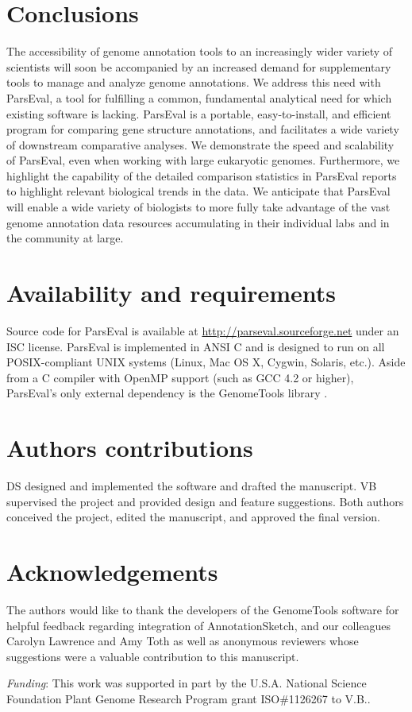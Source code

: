 \section{Conclusions}
The accessibility of genome annotation tools to an increasingly wider variety of scientists will soon be accompanied by an increased demand for supplementary tools to manage and analyze genome annotations.
We address this need with ParsEval, a tool for fulfilling a common, fundamental analytical need for which existing software is lacking.
ParsEval is a portable, easy-to-install, and efficient program for comparing gene structure annotations, and facilitates a wide variety of downstream comparative analyses.
We demonstrate the speed and scalability of ParsEval, even when working with large eukaryotic genomes.
Furthermore, we highlight the capability of the detailed comparison statistics in ParsEval reports to highlight relevant biological trends in the data.
We anticipate that ParsEval will enable a wide variety of biologists to more fully take advantage of the vast genome annotation data resources accumulating in their individual labs and in the community at large.


\section{Availability and requirements}
Source code for ParsEval is available at \url{http://parseval.sourceforge.net} under an ISC license.
ParsEval is implemented in ANSI C and is designed to run on all POSIX-compliant UNIX systems (Linux, Mac OS X, Cygwin, Solaris, etc.).
Aside from a C compiler with OpenMP support (such as GCC 4.2 or higher), ParsEval's only external dependency is the GenomeTools library \citep{GenomeToolsWebsite}.


\section{Authors contributions}
DS designed and implemented the software and drafted the manuscript.
VB supervised the project and provided design and feature suggestions.
Both authors conceived the project, edited the manuscript, and approved the final version.


\section{Acknowledgements}
The authors would like to thank the developers of the GenomeTools software for helpful feedback regarding integration of AnnotationSketch, and our colleagues Carolyn Lawrence and Amy Toth as well as anonymous reviewers whose suggestions were a valuable contribution to this manuscript.

\emph{Funding}: This work was supported in part by the U.S.A. National Science Foundation Plant Genome Research Program grant ISO\#1126267 to V.B..
